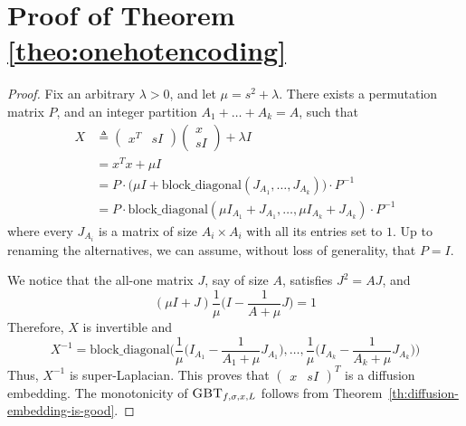 \documentclass{article}
\newcommand{\GBT}{\textsc{GBT}}
\begin{document}
\section{Proof of Theorem \ref{theo:onehotencoding}}
\label{app:theooneshot}

\begin{proof}
    Fix an arbitrary $\lambda > 0$,
    and let $\mu = s^2 + \lambda$.
    There exists a permutation matrix $P$,
    and an integer partition $A_1 + \dots + A_k = A$,
    such that
    \begin{align}
        X &\triangleq \begin{pmatrix}
           x^T & sI 
        \end{pmatrix}
        \begin{pmatrix}
           x \\ sI 
        \end{pmatrix}
        + \lambda I \\
        &= x^Tx + \mu I  \\
        &= P \cdot
        \Big(
            \mu I + \text{block\_diagonal}(J_{A_1},\dots,J_{A_k}) 
        \Big) \cdot P^{-1} \\
        &= P \cdot
            \text{block\_diagonal}(
            \mu I_{A_1} + J_{A_1},
            \dots,
            \mu I_{A_k} + J_{A_k}
            ) \cdot P^{-1}
    \end{align}
    where every $J_{A_i}$ is a matrix of size $A_i \times A_i$
    with all its entries set to $1$.
    Up to renaming the alternatives, we can assume,
    without loss of generality, that $P = I$.

    We notice that
    the all-one matrix $J$, say of size $A$, satisfies
    $J^2 = A J$, and
    \begin{equation}
        (\mu I + J)\frac{1}{\mu }\Big(I - \frac{1}{A+\mu}J\Big) = 1
    \end{equation}
    Therefore, $X$ is invertible and
    \begin{equation}
        X^{-1} = \text{block\_diagonal}
        \Big(
        \frac{1}{\mu}\big(I_{A_1} - \frac{1}{A_1 + \mu}J_{A_1}\big),
        \dots,
        \frac{1}{\mu}\big(I_{A_k} - \frac{1}{A_k + \mu}J_{A_k}\big)
        \Big)
    \end{equation}
    Thus, $X^{-1}$ is super-Laplacian.
    This proves that $\begin{pmatrix} x & sI \end{pmatrix}^T$ is a diffusion embedding.
    The monotonicity of $\GBT_{f,\sigma,x,L}$ follows 
    from Theorem~\ref{th:diffusion-embedding-is-good}.
\end{proof}
\end{document}
